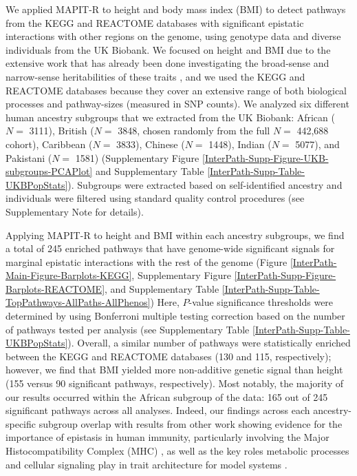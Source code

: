 \documentclass[10pt,a4paper]{article}
\begin{document}
We applied MAPIT-R to height and body mass index (BMI) to detect pathways from the KEGG and REACTOME databases \cite{Liberzon2011} with significant epistatic interactions with other regions on the genome, using genotype data and diverse individuals from the UK Biobank. We focused on height and BMI due to the extensive work that has already been done investigating the broad-sense and narrow-sense heritabilities of these traits \cite{Yang2010,Elks2012,Visscher2012,Finucane2015,Speed2017,Wainschtein2019}, and we used the KEGG and REACTOME databases because they cover an extensive range of both biological processes and pathway-sizes (measured in SNP counts). We analyzed six different human ancestry subgroups that we extracted from the UK Biobank: African ($N=$ 3111), British ($N=$ 3848, chosen randomly from the full $N=$ 442,688 cohort), Caribbean ($N=$ 3833), Chinese ($N=$ 1448), Indian ($N=$ 5077), and Pakistani ($N=$ 1581) (Supplementary Figure \ref{InterPath-Supp-Figure-UKB-subgroups-PCAPlot} and Supplementary Table \ref{InterPath-Supp-Table-UKBPopStats}). Subgroups were extracted based on self-identified ancestry and individuals were filtered using standard quality control procedures (see Supplementary Note for details).

Applying MAPIT-R to height and BMI within each ancestry subgroups, we find a total of 245 enriched pathways that have genome-wide significant signals for marginal epistatic interactions with the rest of the genome (Figure \ref{InterPath-Main-Figure-Barplots-KEGG}, Supplementary Figure \ref{InterPath-Supp-Figure-Barplots-REACTOME}, and Supplementary Table \ref{InterPath-Supp-Table-TopPathways-AllPaths-AllPhenos}) Here, $P$-value significance thresholds were determined by using Bonferroni multiple testing correction based on the number of pathways tested per analysis (see Supplementary Table \ref{InterPath-Supp-Table-UKBPopStats}). Overall, a similar number of pathways were statistically enriched between the KEGG and REACTOME databases (130 and 115, respectively); however, we find that BMI yielded more non-additive genetic signal than height (155 versus 90 significant pathways, respectively). Most notably, the majority of our results occurred within the African subgroup of the data: 165 out of 245 significant pathways across all analyses. Indeed, our findings across each ancestry-specific subgroup overlap with results from other work showing evidence for the importance of epistasis in human immunity, particularly involving the Major Histocompatibility Complex (MHC) \cite{Martin2002,Williams2005,Wan2010,Rose2012,Lareau2016,Opi2018,Zhang2019}, as well as the key roles metabolic processes and cellular signaling play in trait architecture for model systems \cite{Segre2005,Snitkin2011,Podgornaia2015,Sorrells2015,Tyler2017,Nghe2018,Jiao2019}. 
\end{document}
